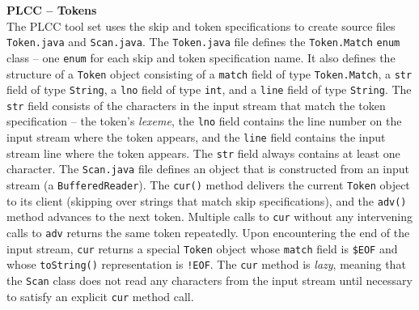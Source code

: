 \begin{minipage}[t]{\sw}
\slidenumber
\LARGE
{\bf PLCC -- Tokens}\\
The PLCC tool set uses the skip and token specifications
to create source files \verb'Token.java' and \verb'Scan.java'.\exx
The \verb'Token.java' file defines the \verb'Token.Match' \verb'enum' class --
one \verb'enum' for each skip and token specification name.
It also defines the structure of a \verb'Token' object
consisting of a \verb'match' field of type \verb'Token.Match',
a \verb'str' field of type \verb'String',
a \verb'lno' field of type \verb'int',
and a \verb'line' field of type \verb'String'.
The \verb'str' field consists of the characters in the input stream
that match the token specification -- the token's {\em lexeme},
the \verb'lno' field contains the line number on the input stream
where the token appears,
and the \verb'line' field contains the input stream line
where the token appears.
The \verb'str' field always contains at least one character.\exx
The \verb'Scan.java' file defines an object
that is constructed from an input stream (a \verb'BufferedReader').
The \verb'cur()' method delivers the current \verb'Token' object to its client
(skipping over strings that match skip specifications),
and the \verb'adv()' method advances to the next token.
Multiple calls to \verb'cur' without any intervening calls to \verb'adv'
returns the same token repeatedly.\exx
Upon encountering the end of the input stream,
\verb'cur' returns a special \verb'Token' object
whose \verb'match' field is \verb'$EOF'
and whose \verb'toString()' representation is \verb'!EOF'.
The \verb'cur' method is {\em lazy},
meaning that the \verb'Scan' class does not read any characters
from the input stream until necessary
to satisfy an explicit \verb'cur' method call.
\end{minipage}
\clearpage
